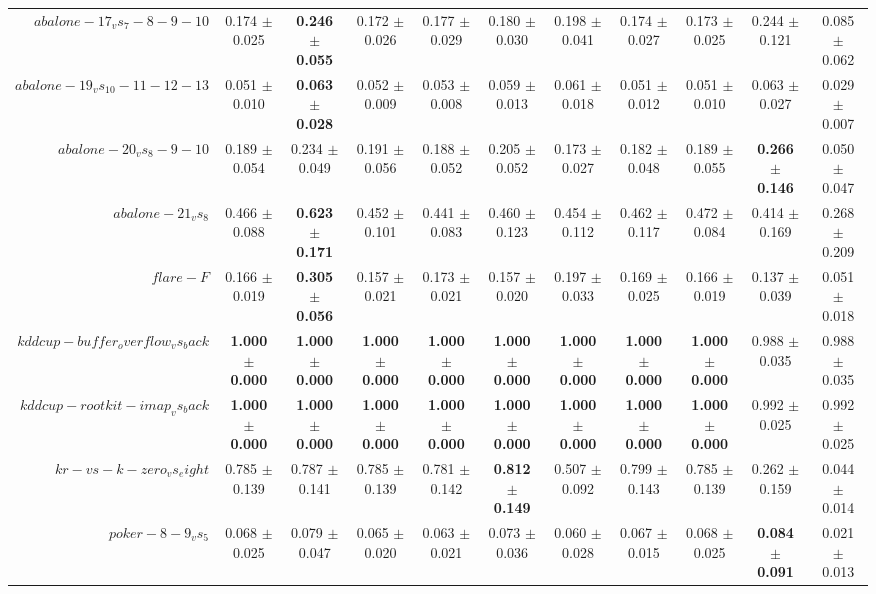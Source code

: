 \begin{table}[!ht]
{\begin{tabular}{r c c c c c c c c c c}
$abalone-17_vs_7-8-9-10$ & 0.174 $\pm$ 0.025 & \textbf{0.246 $\pm$ 0.055} & 0.172 $\pm$ 0.026 & 0.177 $\pm$ 0.029 & 0.180 $\pm$ 0.030 & 0.198 $\pm$ 0.041 & 0.174 $\pm$ 0.027 & 0.173 $\pm$ 0.025 & 0.244 $\pm$ 0.121 & 0.085 $\pm$ 0.062 \\
$abalone-19_vs_10-11-12-13$ & 0.051 $\pm$ 0.010 & \textbf{0.063 $\pm$ 0.028} & 0.052 $\pm$ 0.009 & 0.053 $\pm$ 0.008 & 0.059 $\pm$ 0.013 & 0.061 $\pm$ 0.018 & 0.051 $\pm$ 0.012 & 0.051 $\pm$ 0.010 & 0.063 $\pm$ 0.027 & 0.029 $\pm$ 0.007 \\
$abalone-20_vs_8-9-10$ & 0.189 $\pm$ 0.054 & 0.234 $\pm$ 0.049 & 0.191 $\pm$ 0.056 & 0.188 $\pm$ 0.052 & 0.205 $\pm$ 0.052 & 0.173 $\pm$ 0.027 & 0.182 $\pm$ 0.048 & 0.189 $\pm$ 0.055 & \textbf{0.266 $\pm$ 0.146} & 0.050 $\pm$ 0.047 \\
$abalone-21_vs_8$ & 0.466 $\pm$ 0.088 & \textbf{0.623 $\pm$ 0.171} & 0.452 $\pm$ 0.101 & 0.441 $\pm$ 0.083 & 0.460 $\pm$ 0.123 & 0.454 $\pm$ 0.112 & 0.462 $\pm$ 0.117 & 0.472 $\pm$ 0.084 & 0.414 $\pm$ 0.169 & 0.268 $\pm$ 0.209 \\
$flare-F$ & 0.166 $\pm$ 0.019 & \textbf{0.305 $\pm$ 0.056} & 0.157 $\pm$ 0.021 & 0.173 $\pm$ 0.021 & 0.157 $\pm$ 0.020 & 0.197 $\pm$ 0.033 & 0.169 $\pm$ 0.025 & 0.166 $\pm$ 0.019 & 0.137 $\pm$ 0.039 & 0.051 $\pm$ 0.018 \\
$kddcup-buffer_overflow_vs_back$ & \textbf{1.000 $\pm$ 0.000} & \textbf{1.000 $\pm$ 0.000} & \textbf{1.000 $\pm$ 0.000} & \textbf{1.000 $\pm$ 0.000} & \textbf{1.000 $\pm$ 0.000} & \textbf{1.000 $\pm$ 0.000} & \textbf{1.000 $\pm$ 0.000} & \textbf{1.000 $\pm$ 0.000} & 0.988 $\pm$ 0.035 & 0.988 $\pm$ 0.035 \\
$kddcup-rootkit-imap_vs_back$ & \textbf{1.000 $\pm$ 0.000} & \textbf{1.000 $\pm$ 0.000} & \textbf{1.000 $\pm$ 0.000} & \textbf{1.000 $\pm$ 0.000} & \textbf{1.000 $\pm$ 0.000} & \textbf{1.000 $\pm$ 0.000} & \textbf{1.000 $\pm$ 0.000} & \textbf{1.000 $\pm$ 0.000} & 0.992 $\pm$ 0.025 & 0.992 $\pm$ 0.025 \\
$kr-vs-k-zero_vs_eight$ & 0.785 $\pm$ 0.139 & 0.787 $\pm$ 0.141 & 0.785 $\pm$ 0.139 & 0.781 $\pm$ 0.142 & \textbf{0.812 $\pm$ 0.149} & 0.507 $\pm$ 0.092 & 0.799 $\pm$ 0.143 & 0.785 $\pm$ 0.139 & 0.262 $\pm$ 0.159 & 0.044 $\pm$ 0.014 \\
$poker-8-9_vs_5$ & 0.068 $\pm$ 0.025 & 0.079 $\pm$ 0.047 & 0.065 $\pm$ 0.020 & 0.063 $\pm$ 0.021 & 0.073 $\pm$ 0.036 & 0.060 $\pm$ 0.028 & 0.067 $\pm$ 0.015 & 0.068 $\pm$ 0.025 & \textbf{0.084 $\pm$ 0.091} & 0.021 $\pm$ 0.013 \\

\end{tabular}}
\end{table}

